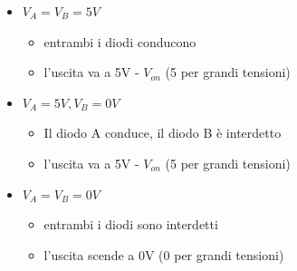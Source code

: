 \begin{itemize}
    \item $V_A = V_B = 5V$
    \begin{itemize}
        \item entrambi i diodi conducono
        \item l'uscita va a 5V - $V_{on}$ (5 per grandi tensioni)
    \end{itemize}
    \item $V_A = 5V,  V_B = 0V$
    \begin{itemize}
        \item Il diodo A conduce, il diodo B è interdetto
        \item l'uscita va a 5V - $V_{on}$ (5 per grandi tensioni)
    \end{itemize}
    \item $V_A = V_B = 0V$
    \begin{itemize}
        \item entrambi i diodi sono interdetti
        \item l'uscita scende a 0V (0 per grandi tensioni)
    \end{itemize}
\end{itemize}


